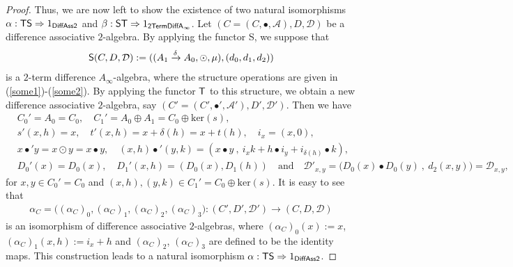 \documentclass[a4paper,reqno,10pt]{amsart}
\theoremstyle{plain}
\theoremstyle{definition}
\theoremstyle{remark}
\begin{document}
\begin{proof}
Thus, we are now left to show the existence of two natural isomorphisms $\alpha : {\sf TS} \Rightarrow  1_{\sf DiffAss2}$ and $\beta: {\sf ST} \Rightarrow 1_{\sf 2TermDiffA_\infty }$. Let $(C = (C , \bullet, \mathcal{A}), D, \mathcal{D})$ be a difference associative $2$-algebra. By applying the functor {\sf S}, we suppose that
\begin{align*}
    {\sf S} (C, D, \mathcal{D}) := ((A_1 \xrightarrow{\delta} A_0, \odot, \mu ), (d_0, d_1, d_2) )
\end{align*}
is a $2$-term difference $A_\infty$-algebra, where the structure operations are given in (\ref{some1})-(\ref{some2}). By applying the functor ${\sf T}$ to this structure, we obtain a new difference associative $2$-algebra, say $(C' =  (C' , \bullet', \mathcal{A}'), D', \mathcal{D}')$. Then we have
\begin{align*}
    &C_0'= A_0 = C_0, \quad C_1'= A_0 \oplus A_1 = C_0 \oplus \mathrm{ker}(s),\\
    &s' (x, h) = x, \quad t'(x, h) = x + \delta (h) = x + t (h), \quad i_x = (x, 0),\\
    &x \bullet' y = x \odot y =  x \bullet y, \quad (x, h) \bullet' (y, k) = ( x \bullet y ~ \! , ~ \! i_x k + h \bullet i_y + i_{\delta (h)} \bullet k), \\
    &D_0'(x) = D_0 (x), \quad D_1'(x, h) = (D_0 (x) , D_1 (h)) ~~~ \text{ and } ~~~ \mathcal{D}'_{x, y} = \big( D_0 (x) \bullet D_0 (y) ~ \!, ~\! d_2 (x, y)    \big) = \mathcal{D}_{x, y},
\end{align*}
for $x, y \in C_0' = C_0$ and $(x, h), (y, k) \in C_1' = C_0 \oplus \mathrm{ker} (s)$. It is easy to see that 
\begin{align*}
    \alpha_C = \big(  ( \alpha_C)_0, ( \alpha_C)_1, ( \alpha_C)_2, ( \alpha_C)_3   \big) : (C', D', \mathcal{D}') \rightarrow (C, D, \mathcal{D})
\end{align*}
is an isomorphism of difference associative $2$-algebras, where $ ( \alpha_C)_0 (x) := x$, $ ( \alpha_C)_1 (x, h) := i_x + h$ and $ ( \alpha_C)_2$, $ ( \alpha_C)_3$ are defined to be the identity maps. This construction leads to a natural isomorphism $\alpha : {\sf TS} \Rightarrow  1_{\sf DiffAss2}$.

\medskip


\end{proof}
\end{document}
